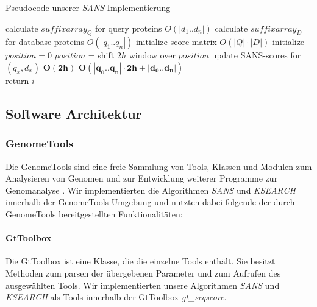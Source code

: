 \documentclass{article}
\begin{document}
\begin{algorithm}
  \caption{Pseudocode unserer \emph{SANS}-Implementierung}
 \begin{algorithmic}
     \State calculate $suffixarray_Q$ for query proteins \Comment $O(|d_1..d_n|)$
     \State calculate $suffixarray_D$ for database proteins \Comment $O(|q_1..q_n|)$
     \State initialize score matrix \Comment $O(|Q|\cdot|D|)$
     \State initialize $position = 0$
       \State  $position$ =  
       \State shift $2h$ window over $position$ 
         \State update SANS-scores for  $(q_x,d_x)$
       \EndFor \Comment $\mathbf{O(2h)}$
     \EndFor \Comment $\mathbf{O(|q_0..q_n|\cdot2h + |d_0..d_n|)}$
    \EndFunction  {}   \\
    
          \State return $i$ 
        \EndIf
      \EndFor 
    \EndFunction
  \end{algorithmic}
\end{algorithm}

\subsection{Software Architektur}

\subsubsection{GenomeTools}

Die GenomeTools sind eine freie Sammlung von Tools, Klassen und Modulen zum
Analysieren von Genomen und zur Entwicklung weiterer Programme zur Genomanalyse \cite{gtools}. Wir implementierten die Algorithmen \emph{SANS} und \emph{KSEARCH} innerhalb der GenomeTools-Umgebung und nutzten dabei folgende der durch GenomeTools bereitgestellten Funktionalitäten:

\paragraph{GtToolbox}
Die GtToolbox ist eine Klasse, die die einzelne Tools enthält. Sie besitzt
Methoden zum parsen der übergebenen Parameter und zum Aufrufen des ausgewählten
Tools. Wir implementierten unsere Algorithmen \emph{SANS} und \emph{KSEARCH} als Tools
innerhalb der GtToolbox \emph{gt\_seqscore}. 
\end{document}
